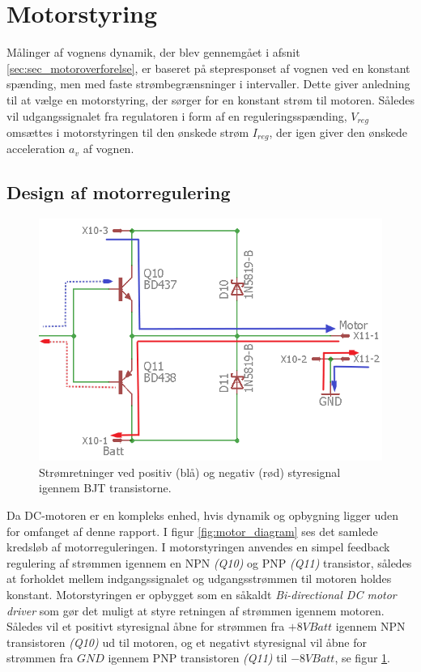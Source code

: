 \section{Motorstyring }\label{sec:sec_motorstyring}
Målinger af vognens dynamik, der blev gennemgået i afsnit \ref{sec:sec_motoroverforelse}, er baseret på stepresponset af vognen ved en konstant spænding, men med faste strømbegrænsninger i intervaller.
Dette giver anledning til at vælge en motorstyring, der sørger for en konstant strøm til motoren.
Således vil udgangssignalet fra regulatoren i form af en reguleringsspænding, $V_{reg}$ omsættes i motorstyringen til den ønskede strøm $I_{reg}$, der igen giver den ønskede acceleration $a_v$ af vognen.  

\subsection{Design af motorregulering}
\begin{figure}
	\centering
	\includegraphics[width=.45\textwidth]{billeder/motor_bidirectional.png}
	\caption{Strømretninger ved positiv (blå) og negativ (rød) styresignal igennem BJT transistorne.}
	\label{fig:motor_bidirectional}
\end{figure}
Da DC-motoren er en kompleks enhed, hvis dynamik og opbygning ligger uden for omfanget af denne rapport. 
I figur \ref{fig:motor_diagram} ses det samlede kredsløb af motorreguleringen.
I motorstyringen anvendes en simpel feedback regulering af strømmen igennem en NPN \emph{(Q10)} og PNP \emph{(Q11)} transistor, således at forholdet mellem indgangssignalet og udgangsstrømmen til motoren holdes konstant.
Motorstyringen er opbygget som en såkaldt \textit{ Bi-directional DC motor driver} som gør det muligt at styre retningen af strømmen igennem motoren.
Således vil et positivt styresignal åbne for strømmen fra $+8V Batt$ igennem NPN transistoren \emph{(Q10)} ud til motoren, og et negativt styresignal vil åbne for strømmen fra $GND$ igennem PNP transistoren \emph{(Q11)} til $-8V Batt$, se figur \ref{fig:motor_bidirectional}.

